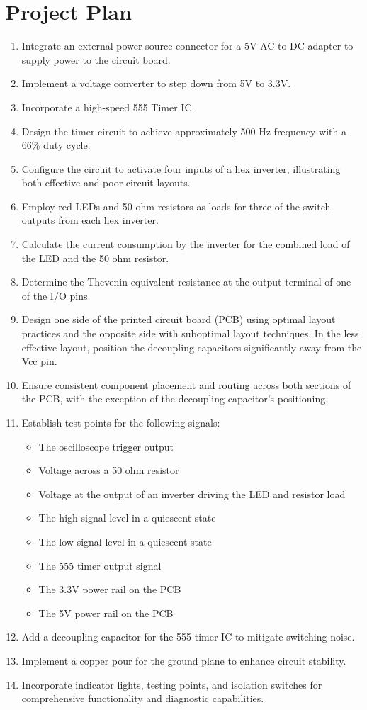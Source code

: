 \documentclass[a4paper,11pt]{article}%
\begin{document}
\section{Project Plan}
\begin{enumerate}
	\item Integrate an external power source connector for a 5V AC to DC adapter to supply power to the circuit board.
	\item Implement a voltage converter to step down from 5V to 3.3V.
	\item Incorporate a high-speed 555 Timer IC.
	\item Design the timer circuit to achieve approximately 500 Hz frequency with a 66\% duty cycle.
	\item Configure the circuit to activate four inputs of a hex inverter, illustrating both effective and poor circuit layouts.
	\item Employ red LEDs and 50 ohm resistors as loads for three of the switch outputs from each hex inverter.
	\item Calculate the current consumption by the inverter for the combined load of the LED and the 50 ohm resistor.
	\item Determine the Thevenin equivalent resistance at the output terminal of one of the I/O pins.
	\item Design one side of the printed circuit board (PCB) using optimal layout practices and the opposite side with suboptimal layout techniques. In the less effective layout, position the decoupling capacitors significantly away from the Vcc pin.
	\item  Ensure consistent component placement and routing across both sections of the PCB, with the exception of the decoupling capacitor's positioning.
	\item  Establish test points for the following signals:
	\begin{itemize}
		\item The oscilloscope trigger output
		\item Voltage across a 50 ohm resistor
		\item Voltage at the output of an inverter driving the LED and resistor load
		\item The high signal level in a quiescent state
		\item The low signal level in a quiescent state
		\item The 555 timer output signal
		\item The 3.3V power rail on the PCB
		\item The 5V power rail on the PCB
	\end{itemize}
	
	\item Add a decoupling capacitor for the 555 timer IC to mitigate switching noise.
	\item Implement a copper pour for the ground plane to enhance circuit stability.
	\item Incorporate indicator lights, testing points, and isolation switches for comprehensive functionality and diagnostic capabilities.
\end{enumerate}
\end{document}
